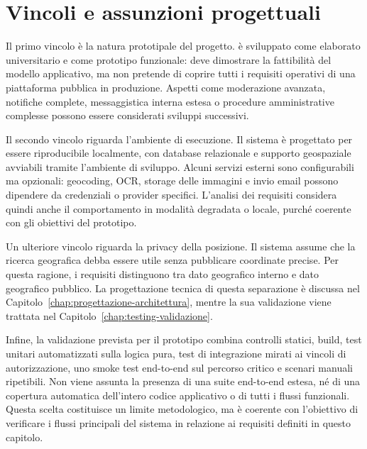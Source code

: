 \section{Vincoli e assunzioni progettuali}
\label{sec:vincoli-assunzioni}

Il primo vincolo è la natura prototipale del progetto. \projectname{} è sviluppato come elaborato universitario e come prototipo funzionale: deve dimostrare la fattibilità del modello applicativo, ma non pretende di coprire tutti i requisiti operativi di una piattaforma pubblica in produzione. Aspetti come moderazione avanzata, notifiche complete, messaggistica interna estesa o procedure amministrative complesse possono essere considerati sviluppi successivi.

Il secondo vincolo riguarda l'ambiente di esecuzione. Il sistema è progettato per essere riproducibile localmente, con database relazionale e supporto geospaziale avviabili tramite l'ambiente di sviluppo. Alcuni servizi esterni sono configurabili ma opzionali: geocoding, OCR, storage delle immagini e invio email possono dipendere da credenziali o provider specifici. L'analisi dei requisiti considera quindi anche il comportamento in modalità degradata o locale, purché coerente con gli obiettivi del prototipo.

Un ulteriore vincolo riguarda la privacy della posizione. Il sistema assume che la ricerca geografica debba essere utile senza pubblicare coordinate precise. Per questa ragione, i requisiti distinguono tra dato geografico interno e dato geografico pubblico. La progettazione tecnica di questa separazione è discussa nel Capitolo~\ref{chap:progettazione-architettura}, mentre la sua validazione viene trattata nel Capitolo~\ref{chap:testing-validazione}.

Infine, la validazione prevista per il prototipo combina controlli statici, build, test unitari automatizzati sulla logica pura, test di integrazione mirati ai vincoli di autorizzazione, uno smoke test end-to-end sul percorso critico e scenari manuali ripetibili. Non viene assunta la presenza di una suite end-to-end estesa, né di una copertura automatica dell'intero codice applicativo o di tutti i flussi funzionali. Questa scelta costituisce un limite metodologico, ma è coerente con l'obiettivo di verificare i flussi principali del sistema in relazione ai requisiti definiti in questo capitolo.
